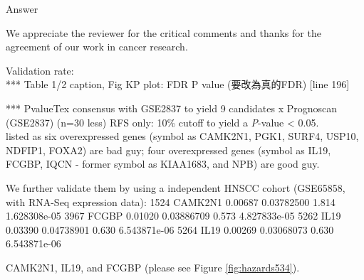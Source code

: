 \documentclass[preprint,12pt]{elsarticle}
\newenvironment{MyColorPar}[1]{%
    \leavevmode\color{#1}\ignorespaces%
}{%
}%
\begin{document}
%
\begin{MyColorPar}{blue}
Answer


We appreciate the reviewer for the critical comments and thanks for the agreement of our work in cancer research.

Validation rate:\\

*** Table 1/2 caption, Fig KP plot: FDR P value (要改為真的FDR) [line 196]

***  PvalueTex consensus with GSE2837 to yield 9 candidates
x Prognoscan (GSE2837) (n=30 less)  RFS only:  10\% cutoff to yield a \textit{P}-value < 0.05.\\
listed as
six overexpressed genes (symbol as CAMK2N1, PGK1, SURF4, USP10, NDFIP1, FOXA2) are bad guy;
four overexpressed genes (symbol as IL19, FCGBP, IQCN - former symbol as KIAA1683, and NPB) are good guy.

We further
validate them by using a independent HNSCC cohort (GSE65858, with RNA-Seq expression data): 
1524     CAMK2N1   0.00687   0.03782500  1.814 1.628308e-05
3967       FCGBP   0.01020   0.03886709  0.573 4.827833e-05
5262        IL19   0.03390   0.04738901  0.630 6.543871e-06
5264        IL19   0.00269   0.03068073  0.630 6.543871e-06

CAMK2N1, IL19, and FCGBP
(please see Figure \ref{fig:hazards534}).



\end{MyColorPar}
\end{document}
